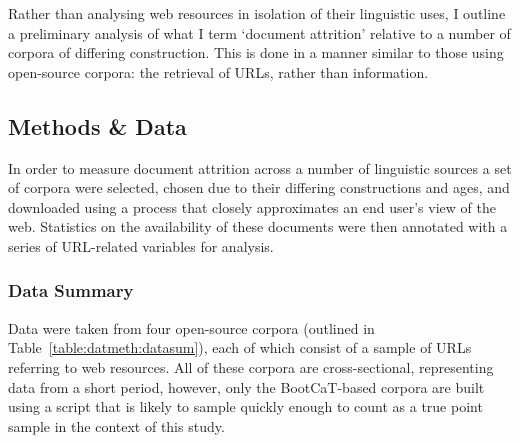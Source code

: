 Rather than analysing web resources in isolation of their linguistic uses, I outline a preliminary analysis of what I term `document attrition' relative to a number of corpora of differing construction.  This is done in a manner similar to those using open-source corpora: the retrieval of URLs, rather than information.













\subsection{Methods \& Data}


In order to measure document attrition across a number of linguistic sources a set of corpora were selected, chosen due to their differing constructions and ages, and downloaded using a process that closely approximates an end user's view of the web.  Statistics on the availability of these documents were then annotated with a series of URL-related variables for analysis.




\subsubsection{Data Summary}
Data were taken from four open-source corpora (outlined in Table~\ref{table:datmeth:datasum}), each of which consist of a sample of URLs referring to web resources.  All of these corpora are cross-sectional, representing data from a short period, however, only the BootCaT-based corpora are built using a script that is likely to sample quickly enough to count as a true point sample in the context of this study.

